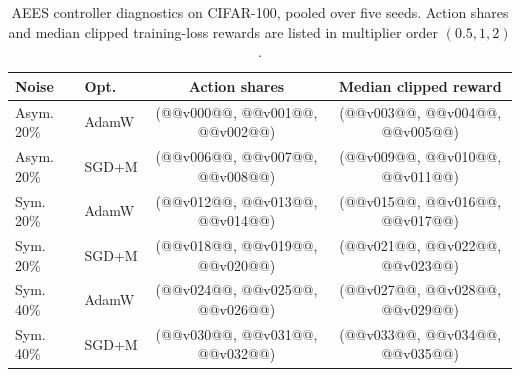 \begin{table}[H]
\centering
\caption{AEES controller diagnostics on CIFAR-100, pooled over five seeds.
Action shares and median clipped training-loss rewards are listed in
multiplier order $(0.5,1,2)$.}
\label{tab:appendix-cifar-controller}
\scriptsize
\setlength{\tabcolsep}{3.2pt}
\renewcommand{\arraystretch}{1.05}
\begin{tabular}{llcc}
\toprule
Noise & Opt. & Action shares & Median clipped reward \\
\midrule
Asym. 20\% & AdamW & (@@v000@@, @@v001@@, @@v002@@) & (@@v003@@, @@v004@@, @@v005@@) \\
Asym. 20\% & SGD+M & (@@v006@@, @@v007@@, @@v008@@) & (@@v009@@, @@v010@@, @@v011@@) \\
Sym. 20\% & AdamW & (@@v012@@, @@v013@@, @@v014@@) & (@@v015@@, @@v016@@, @@v017@@) \\
Sym. 20\% & SGD+M & (@@v018@@, @@v019@@, @@v020@@) & (@@v021@@, @@v022@@, @@v023@@) \\
Sym. 40\% & AdamW & (@@v024@@, @@v025@@, @@v026@@) & (@@v027@@, @@v028@@, @@v029@@) \\
Sym. 40\% & SGD+M & (@@v030@@, @@v031@@, @@v032@@) & (@@v033@@, @@v034@@, @@v035@@) \\
\bottomrule
\end{tabular}
\end{table}
